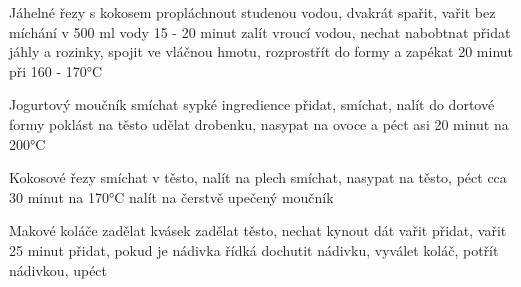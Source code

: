 \documentclass[12pt,a4paper]{article}
\begin{document}
\begin{recipe}{Jáhelné řezy s kokosem}
   propláchnout studenou vodou, dvakrát spařit, vařit bez míchání v 500 ml vody 15 - 20 minut
   zalít vroucí vodou, nechat nabobtnat
   přidat jáhly a rozinky, spojit ve vláčnou hmotu, rozprostřít do formy a zapékat 20 minut při 160 - 170°C
\end{recipe}
\newpage

\begin{recipe}{Jogurtový moučník}
   smíchat sypké ingredience
   přidat, smíchat, nalít do dortové formy
   poklást na těsto
   udělat drobenku, nasypat na ovoce a péct asi 20 minut na 200°C
\end{recipe}
\newpage

\begin{recipe}{Kokosové řezy}
   smíchat v těsto, nalít na plech
   smíchat, nasypat na těsto, péct cca 30 minut na 170°C
   nalít na čerstvě upečený moučník
\end{recipe}
\newpage

\begin{recipe}{Makové koláče}
   zadělat kvásek
   zadělat těsto, nechat kynout
   dát vařit
   přidat, vařit 25 minut
   přidat, pokud je nádivka řídká
   dochutit nádivku, vyválet koláč, potřít nádivkou, upéct
\end{recipe}
\newpage
\end{document}
